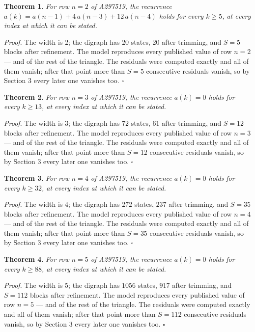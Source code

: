 \documentclass[11pt]{article}
\newtheorem{theorem}{Theorem}
\theoremstyle{definition}
\begin{document}
\begin{theorem} For row $n = 2$ of A297519, the recurrence $a(k) = a(n-1) + 4\,a(n-3) + 12\,a(n-4)$ holds for every $k \ge 5$, at every index at which it can be stated.\end{theorem}

{\itshape Proof.} The width is $2$; the digraph has $20$ states, $20$ after trimming, and $S = 5$ blocks after refinement. The model reproduces every published value of row $n = 2$ --- and of the rest of the triangle. The residuals were computed exactly and all of them vanish; after that point more than $S = 5$ consecutive residuals vanish, so by Section 3 every later one vanishes too. $\square$

\begin{theorem} For row $n = 3$ of A297519, the recurrence $a(k) = 0$ holds for every $k \ge 13$, at every index at which it can be stated.\end{theorem}

{\itshape Proof.} The width is $3$; the digraph has $72$ states, $61$ after trimming, and $S = 12$ blocks after refinement. The model reproduces every published value of row $n = 3$ --- and of the rest of the triangle. The residuals were computed exactly and all of them vanish; after that point more than $S = 12$ consecutive residuals vanish, so by Section 3 every later one vanishes too. $\square$

\begin{theorem} For row $n = 4$ of A297519, the recurrence $a(k) = 0$ holds for every $k \ge 32$, at every index at which it can be stated.\end{theorem}

{\itshape Proof.} The width is $4$; the digraph has $272$ states, $237$ after trimming, and $S = 35$ blocks after refinement. The model reproduces every published value of row $n = 4$ --- and of the rest of the triangle. The residuals were computed exactly and all of them vanish; after that point more than $S = 35$ consecutive residuals vanish, so by Section 3 every later one vanishes too. $\square$

\begin{theorem} For row $n = 5$ of A297519, the recurrence $a(k) = 0$ holds for every $k \ge 88$, at every index at which it can be stated.\end{theorem}

{\itshape Proof.} The width is $5$; the digraph has $1056$ states, $917$ after trimming, and $S = 112$ blocks after refinement. The model reproduces every published value of row $n = 5$ --- and of the rest of the triangle. The residuals were computed exactly and all of them vanish; after that point more than $S = 112$ consecutive residuals vanish, so by Section 3 every later one vanishes too. $\square$
\end{document}
